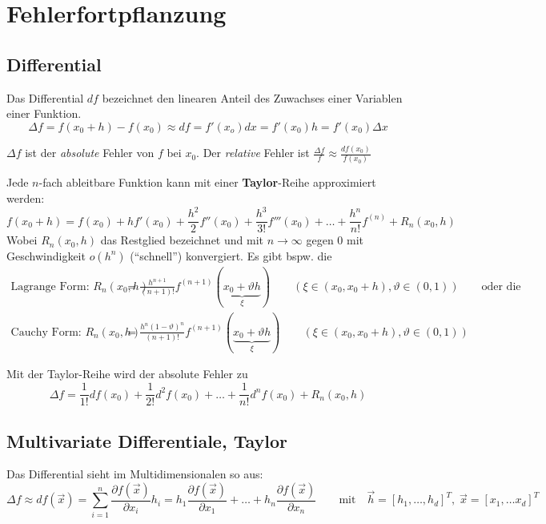 \section{Fehlerfortpflanzung}

\subsection{Differential}
  Das Differential $df$ bezeichnet den linearen Anteil des Zuwachses einer Variablen einer Funktion.
  \[
      \Delta f = f(x_0+h)-f(x_0) \approx df = f'(x_o) dx = f'(x_0) h = f'(x_0) \Delta x
  \]
  
  $\Delta f$ ist der \emph{absolute} Fehler von $f$ bei $x_0$.
  Der \emph{relative} Fehler ist $\frac{\Delta f}{f} \approx \frac{df(x_0)}{f(x_0)}$
  
  Jede $n$-fach ableitbare Funktion kann mit einer \textbf{Taylor}-Reihe approximiert werden:
  $$f(x_0+h) = f(x_0) + h f'(x_0) + \frac{h^2}{2} f''(x_0) + \frac{h^3}{3!} f'''(x_0) + 
  \ldots + \frac{h^n}{n!} f^{(n)} + R_n(x_0,h)$$
  Wobei $R_n(x_0,h)$ das Restglied bezeichnet und mit $n \rightarrow \infty$ gegen $0$ mit 
  Geschwindigkeit $o(h^n)$ ("`schnell"') konvergiert. Es gibt bspw. die 
  \begin{align*}
    \text{Lagrange Form: } R_n(x_0,h) &= \frac{h^{n+1}}{(n+1)!} f^{(n+1)}(\underbrace{x_0 + \vartheta h}_{\xi})
    \qquad (\xi \in (x_0, x_0+h), \vartheta \in (0,1)) \qquad \text{oder die }\\
    \text{Cauchy Form: } R_n(x_0,h) &= \frac{h^n(1-\vartheta)^n}{(n+1)!} f^{(n+1)}(\underbrace{x_0 + \vartheta h}_{\xi})
    \qquad (\xi \in (x_0, x_0+h), \vartheta \in (0,1))
  \end{align*}
  
  Mit der Taylor-Reihe wird der absolute Fehler zu
  \[
      \Delta f = \frac{1}{1!}df(x_0) + \frac{1}{2!}d^2f(x_0) + \ldots + \frac{1}{n!}d^n f(x_0) + R_n(x_0,h)
  \]
  
   
\subsection{Multivariate Differentiale, Taylor}
  Das Differential sieht im Multidimensionalen so aus:
  \[
      \Delta f \approx df(\vec{x}) = \sum\limits_{i=1}^n \frac{\partial f(\vec{x})}{\partial x_i} h_i = h_1 \frac{\partial f(\vec{x})}{\partial x_1} + \ldots + 
      h_n \frac{\partial f(\vec{x})}{\partial x_n} \qquad \text{mit} \quad \vec{h} = [h_1, \ldots, h_d]^T, \; \vec{x} = [x_1, \ldots x_d]^T
  \]

